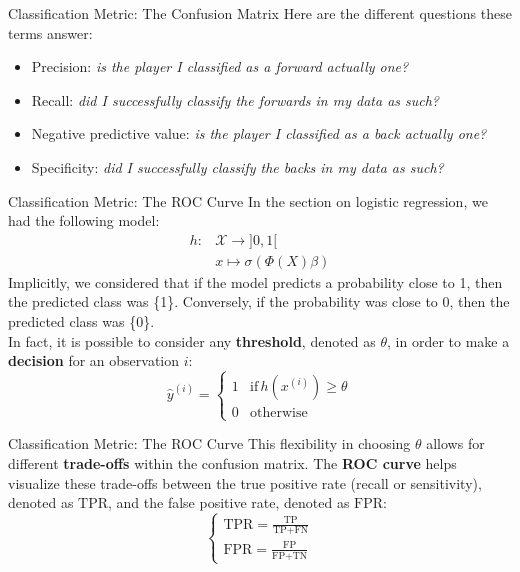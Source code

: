 \begin{frame}{Classification Metric: The Confusion Matrix}
	Here are the different questions these terms answer:
	\begin{itemize}
		\item Precision: \textit{is the player I classified as a forward actually one?}
		\item Recall: \textit{did I successfully classify the forwards in my data as such?}
		\item Negative predictive value: \textit{is the player I classified as a back actually one?}
		\item Specificity: \textit{did I successfully classify the backs in my data as such?}
	\end{itemize}
\end{frame}

\begin{frame}{Classification Metric: The ROC Curve}
	In the section on logistic regression, we had the following model:
	\begin{equation}
		\begin{aligned}
			h: &\mathcal{X} \to ]0, 1[ \\
			&x \mapsto \sigma\left(\Phi(X) \beta\right)
		\end{aligned}
		\nonumber
	\end{equation}
	\pause
	Implicitly, we considered that if the model predicts a probability close to 1, then the predicted class was \{1\}. Conversely, if the probability was close to 0, then the predicted class was \{0\}. \\
	\pause
	\vspace{0.3cm}
	In fact, it is possible to consider any \textbf{threshold}, denoted as $\theta$, in order to make a \textbf{decision} for an observation $i$:
	\begin{equation}
		\hat{y}^{(i)} = 
		\begin{cases}
			1 & \text{if} \, h(x^{(i)}) \ge \theta \\
			0 & \text{otherwise}
		\end{cases}
		\nonumber
	\end{equation}
\end{frame}

\begin{frame}{Classification Metric: The ROC Curve}
	This flexibility in choosing $\theta$ allows for different \textbf{trade-offs} within the confusion matrix. The \textbf{ROC curve} helps visualize these trade-offs between the true positive rate (recall or sensitivity), denoted as $\text{TPR}$, and the false positive rate, denoted as $\text{FPR}$:
	\begin{equation}
		\begin{cases}
			\text{TPR} = \displaystyle \frac{\text{TP}}{\text{TP} + \text{FN}} \\[10pt]
			\text{FPR} = \displaystyle \frac{\text{FP}}{\text{FP} + \text{TN}}
		\end{cases}
		\nonumber
	\end{equation}	
\end{frame}

